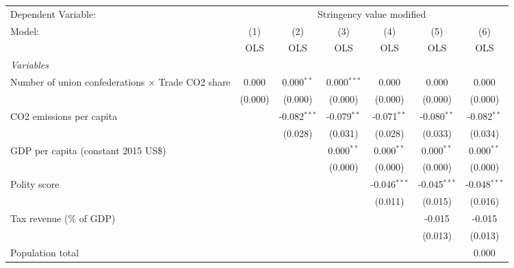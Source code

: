 
\begingroup
\centering
\begin{tabular}{lcccccc}
   \toprule
   Dependent Variable: & \multicolumn{6}{c}{Stringency value modified}\\
   Model:                                                   & (1)     & (2)            & (3)           & (4)            & (5)            & (6)\\  
                                                            &  OLS    & OLS            & OLS           & OLS            & OLS            & OLS\\  
   \midrule
   \emph{Variables}\\
   Number of union confederations $\times$ Trade CO2 share  & 0.000   & 0.000$^{**}$   & 0.000$^{***}$ & 0.000          & 0.000          & 0.000\\   
                                                            & (0.000) & (0.000)        & (0.000)       & (0.000)        & (0.000)        & (0.000)\\   
   CO2 emissions per capita                                 &         & -0.082$^{***}$ & -0.079$^{**}$ & -0.071$^{**}$  & -0.080$^{**}$  & -0.082$^{**}$\\   
                                                            &         & (0.028)        & (0.031)       & (0.028)        & (0.033)        & (0.034)\\   
   GDP per capita (constant 2015 US\$)                      &         &                & 0.000$^{**}$  & 0.000$^{**}$   & 0.000$^{**}$   & 0.000$^{**}$\\   
                                                            &         &                & (0.000)       & (0.000)        & (0.000)        & (0.000)\\   
   Polity score                                             &         &                &               & -0.046$^{***}$ & -0.045$^{***}$ & -0.048$^{***}$\\   
                                                            &         &                &               & (0.011)        & (0.015)        & (0.016)\\   
   Tax revenue (\% of GDP)                                  &         &                &               &                & -0.015         & -0.015\\   
                                                            &         &                &               &                & (0.013)        & (0.013)\\   
   Population total                                         &         &                &               &                &                & 0.000\\   

\end{tabular}
